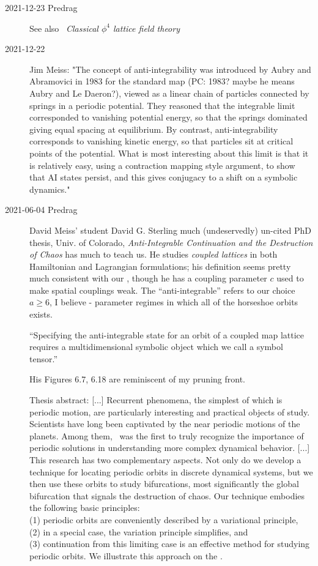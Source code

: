 \begin{description}
  \item[2021-12-23 Predrag]
See also
~{\em Classical {$\phi^4$} lattice field theory}

\item[2021-12-22] %
 {Jim Meiss}:
"The concept of anti-integrability was introduced by Aubry and
Abramovici in 1983 for the standard map (PC: 1983? maybe he
means Aubry and Le Daeron?), viewed as a linear chain of
particles connected by springs in a periodic potential. They reasoned
that the integrable limit corresponded to vanishing potential energy, so
that the springs dominated giving equal spacing at equilibrium. By
contrast, anti-integrability corresponds to vanishing kinetic energy, so
that particles sit at critical points of the potential. What is most
interesting about this limit is that it is relatively easy, using a
contraction mapping style argument, to show that AI states persist, and
this gives conjugacy to a shift on a symbolic dynamics."

\item[2021-06-04 Predrag]
David Meiss' student David G. Sterling
much (undeservedly)
un-cited  {PhD thesis},
Univ. of Colorado,
{\em Anti-Integrable Continuation and the Destruction of Chaos} has much
to teach us. He studies \emph{coupled {\HenonMap} lattices} in both
Hamiltonian and Lagrangian formulations; his definition seems pretty much
consistent with our , though he has a coupling
parameter $c$ used to make spatial couplings weak. The
``anti-integrable'' refers to our choice $a\geq6$, I believe - parameter
regimes in which all of the horseshoe orbits exists.

``Specifying the anti-integrable state for an orbit of a coupled map
lattice requires a multidimensional symbolic object which we call a
symbol tensor.''

His Figures 6.7, 6.18 are reminiscent of my pruning front.

Thesis abstract:
[...] Recurrent phenomena, the
simplest of which is periodic motion, are particularly interesting and
practical objects of study. Scientists have long been captivated by the
near periodic motions of the planets. Among them, \Poincare\ was the
first to truly recognize the importance of periodic solutions in
understanding more complex dynamical behavior. [...] This research has
two complementary aspects. Not only do we develop a technique for
locating periodic orbits in discrete dynamical systems, but we then use
these orbits to study bifurcations, most significantly the global
bifurcation that signals the destruction of chaos. Our technique embodies
the following basic principles:
\\
(1) periodic orbits are conveniently described by a variational principle,
\\
(2) in a special case, the variation principle simplifies, and
\\
(3) continuation from this limiting
case is an effective method for studying periodic orbits. We illustrate
this approach on the \HenonMap.


\end{description}
